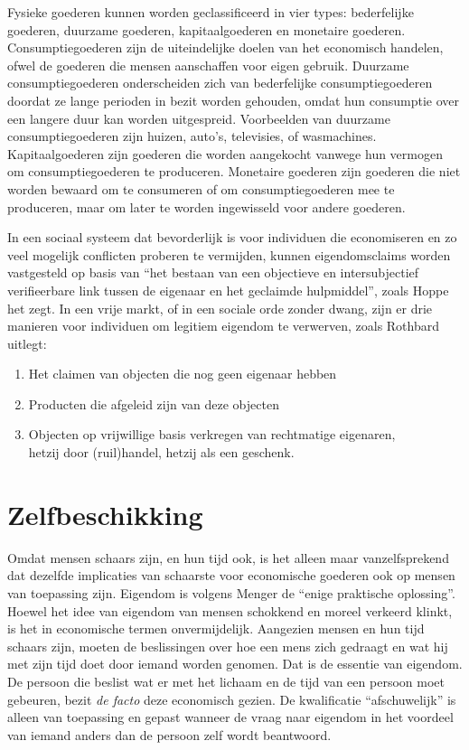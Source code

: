 Fysieke goederen kunnen worden geclassificeerd in vier types: bederfelijke goederen, duurzame goederen, kapitaalgoederen en monetaire goederen. Consumptiegoederen zijn de uiteindelijke doelen van het economisch handelen, ofwel de goederen die mensen aanschaffen voor eigen gebruik. Duurzame consumptiegoederen onderscheiden zich van bederfelijke consumptiegoederen doordat ze lange perioden in bezit worden gehouden, omdat hun consumptie over een langere duur kan worden uitgespreid. Voorbeelden van duurzame consumptiegoederen zijn huizen, auto's, televisies, of wasmachines. Kapitaalgoederen zijn goederen die worden aangekocht vanwege hun vermogen om consumptiegoederen te produceren. Monetaire goederen zijn goederen die niet worden bewaard om te consumeren of om consumptiegoederen mee te produceren, maar om later te worden ingewisseld voor andere goederen.

In een sociaal systeem dat bevorderlijk is voor individuen die economiseren en zo veel mogelijk conflicten proberen te vermijden, kunnen eigendomsclaims worden vastgesteld op basis van \enquote{het bestaan van een objectieve en intersubjectief verifieerbare link tussen de eigenaar en het geclaimde hulpmiddel}, zoals Hoppe het zegt.\autocite{53} In een vrije markt, of in een sociale orde zonder dwang, zijn er drie manieren voor individuen om legitiem eigendom te verwerven, zoals Rothbard uitlegt:

\begin{enumerate}
\def\labelenumi{\arabic{enumi}.}
\item Het claimen van objecten die nog geen eigenaar hebben
\item Producten die afgeleid zijn van deze objecten
\item Objecten op vrijwillige basis verkregen van rechtmatige eigenaren, \\hetzij door (ruil)handel, hetzij als een geschenk.
\end{enumerate}

\section{Zelfbeschikking}

Omdat mensen schaars zijn, en hun tijd ook, is het alleen maar vanzelfsprekend dat dezelfde implicaties van schaarste voor economische goederen ook op mensen van toepassing zijn. Eigendom is volgens Menger de \enquote{enige praktische oplossing}. Hoewel het idee van eigendom van mensen schokkend en moreel verkeerd klinkt, is het in economische termen onvermijdelijk. Aangezien mensen en hun tijd schaars zijn, moeten de beslissingen over hoe een mens zich gedraagt en wat hij met zijn tijd doet door iemand worden genomen. Dat is de essentie van eigendom. De persoon die beslist wat er met het lichaam en de tijd van een persoon moet gebeuren, bezit \emph{de facto} deze economisch gezien. De kwalificatie \enquote{afschuwelijk} is alleen van toepassing en gepast wanneer de vraag naar eigendom in het voordeel van iemand anders dan de persoon zelf wordt beantwoord.

